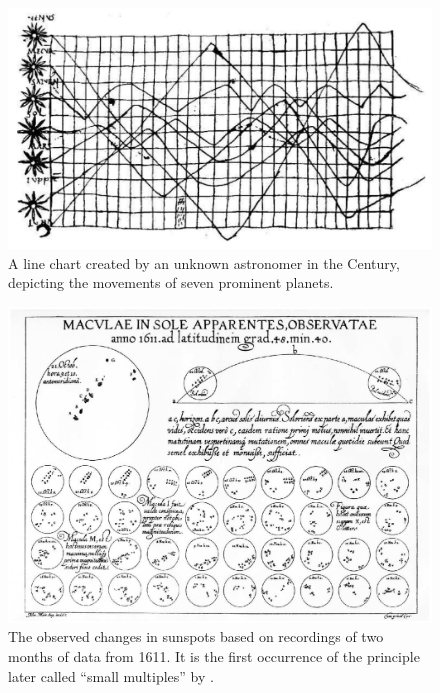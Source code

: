 \begin{figure}[tp]
\centering
\includegraphics[keepaspectratio,width=\linewidth,height=\thirdh]
{images/planetary-movements.png}
\caption[Chart of Planetary Movements from the  Century]{%
A line chart created by an unknown astronomer in the  Century,
depicting the movements of seven prominent planets.
}
\label{fig:PlanetaryMovements}
\end{figure}



\begin{figure}[tp]
\centering
\includegraphics[keepaspectratio,width=\linewidth,height=\thirdh]
{images/sunspot-changes.png}
\caption[Chart of Changes in Sunspots from 1626]{%
The observed changes in sunspots based on recordings
of two months of data from 1611. It is the first occurrence of the
principle later called \enquote{small multiples} by
\textcite{VisualDisplayOfQuantitativeInformation}.
}
\label{fig:SunspotChanges}
\end{figure}

